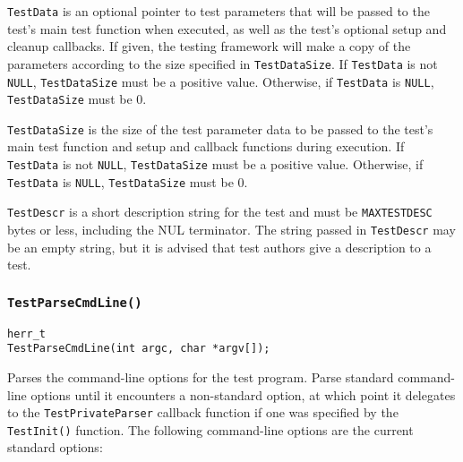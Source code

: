 \documentclass[../HDF5_RFC.tex]{subfiles}
\begin{document}
\texttt{TestData} is an optional pointer to test parameters that will be passed to the test's main
test function when executed, as well as the test's optional setup and cleanup callbacks. If given,
the testing framework will make a copy of the parameters according to the size specified in
\texttt{TestDataSize}. If \texttt{TestData} is not \texttt{NULL}, \texttt{TestDataSize} must be a
positive value. Otherwise, if \texttt{TestData} is \texttt{NULL}, \texttt{TestDataSize} must be 0.

\texttt{TestDataSize} is the size of the test parameter data to be passed to the test's main test
function and setup and callback functions during execution. If \texttt{TestData} is not \texttt{NULL},
\texttt{TestDataSize} must be a positive value. Otherwise, if \texttt{TestData} is \texttt{NULL},
\texttt{TestDataSize} must be 0.

\texttt{TestDescr} is a short description string for the test and must be \texttt{MAXTESTDESC} bytes
or less, including the NUL terminator. The string passed in \texttt{TestDescr} may be an empty string,
but it is advised that test authors give a description to a test.

\subsubsection{\texttt{TestParseCmdLine()}}

\begin{verbatim}
herr_t
TestParseCmdLine(int argc, char *argv[]);
\end{verbatim}

Parses the command-line options for the test program. Parse standard command-line options until it
encounters a non-standard option, at which point it delegates to the \texttt{TestPrivateParser} callback
function if one was specified by the \texttt{TestInit()} function. The following command-line options
are the current standard options:
\end{document}
